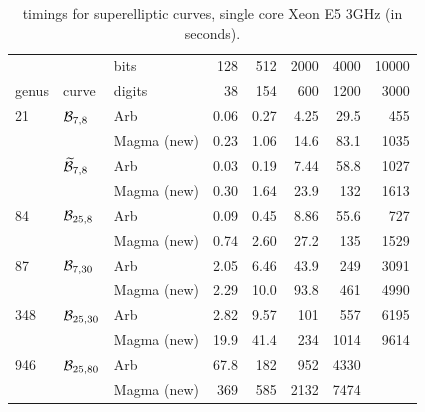 \documentclass[main.tex]{subfiles}
\begin{document}
  \begin{table}[H]
      \begin{center}
          \begin{tabular}{lllrrrrr}
              \toprule
              & & \hfill bits & 128 & 512 & 2000 & 4000 & 10000 \\
              genus & curve & \hfill digits & 38 & 154 & 600 & 1200 & 3000 \\
              \midrule
              21 & $\mathcal{B}_{7,8}$
              &   Arb         & 0.06 & 0.27   & 4.25    & 29.5    & 455 \\
              & & Magma (new) & 0.23  & 1.06  & 14.6  & 83.1   & 1035 \\
              \cmidrule{3-8}
              & $\widetilde{\mathcal{B}}_{7,8}$
              &   Arb         & 0.03 & 0.19  & 7.44    & 58.8   & 1027 \\
              & & Magma (new) & 0.30  & 1.64  & 23.9  & 132 & 1613 \\
              \midrule
              84 & $\mathcal{B}_{25,8}$
              &   Arb         & 0.09   & 0.45   & 8.86     & 55.6    & 727 \\
              & & Magma (new) & 0.74   & 2.60   & 27.2   & 135  & 1529 \\
              \midrule
              87 & $\mathcal{B}_{7,30}$
              &   Arb         & 2.05  & 6.46   & 43.9   & 249   & 3091 \\
              & & Magma (new) & 2.29  & 10.0 & 93.8  & 461  & 4990 \\
              \midrule
              348 & $\mathcal{B}_{25,30}$
              &   Arb         & 2.82   & 9.57    & 101  & 557   & 6195 \\
              & & Magma (new) & 19.9  & 41.4  & 234  & 1014 & 9614 \\
              \midrule
              946 & $\mathcal{B}_{25,80}$
              &   Arb         & 67.8  & 182  & 952   & 4330 \\
              & & Magma (new) & 369 & 585 & 2132 & 7474 \\
              \bottomrule
          \end{tabular}
          \caption{timings for superelliptic curves, single core Xeon E5 3GHz (in seconds).}
          \label{tab:time_sup}
      \end{center}
  \end{table}

  \biblio
  
\end{document}
